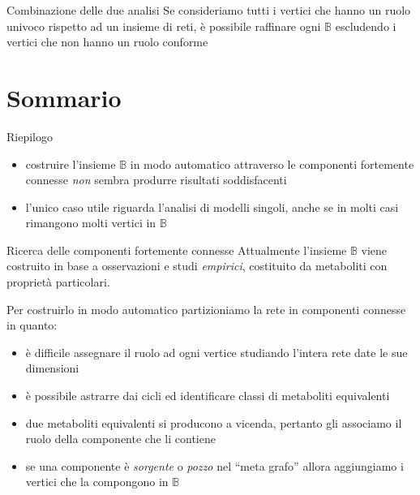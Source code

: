 \documentclass[8pt]{beamer}
\begin{document}
\begin{frame}{Combinazione delle due analisi}
  Se consideriamo tutti i vertici che hanno un ruolo univoco rispetto
  ad un insieme di reti, \`e possibile raffinare ogni $\mathbb{B}$
  escludendo i vertici che non hanno un ruolo conforme
\end{frame}


\section*{Sommario}

\begin{frame}{Riepilogo}
    \begin{itemize}
    \item costruire l'insieme $\mathbb{B}$ in modo automatico
      attraverso le componenti fortemente connesse \emph{non} sembra
      produrre risultati soddisfacenti
    \item l'unico caso utile riguarda l'analisi di modelli singoli,
      anche se in molti casi rimangono molti vertici in $\mathbb{B}$
    \end{itemize}
\end{frame}

\begin{frame}{Ricerca delle componenti fortemente connesse}
  Attualmente l'insieme $\mathbb{B}$ viene costruito in base a
  osservazioni e studi \emph{empirici}, costituito da metaboliti con
  propriet\`a particolari.

  Per costruirlo in modo automatico partizioniamo la rete in
  componenti connesse in quanto:
\begin{itemize}
\item<2-> \`e difficile assegnare il ruolo ad ogni vertice studiando
  l'intera rete date le sue dimensioni
\item<3-> \`e possibile astrarre dai cicli ed identificare classi di
  metaboliti equivalenti
\item<4-> due metaboliti equivalenti si producono a vicenda, pertanto
  gli associamo il ruolo della componente che li contiene
\item<5-> se una componente \`e \emph{sorgente} o \emph{pozzo} nel
  ``meta grafo'' allora aggiungiamo i vertici che la compongono in
  $\mathbb{B}$
\end{itemize}
\end{frame}
\end{document}
